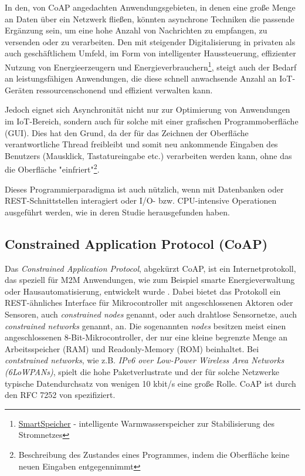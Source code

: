 In den, von CoAP angedachten Anwendungsgebieten, in denen eine große Menge an Daten über ein Netzwerk fließen, könnten asynchrone Techniken die passende Ergänzung sein, um eine hohe Anzahl von Nachrichten zu empfangen, zu versenden oder zu verarbeiten. Den mit steigender Digitalisierung in privaten als auch geschäftlichem Umfeld, im Form von intelligenter Haussteuerung, effizienter Nutzung von Energieerzeugern und Energieverbrauchern\footnote{\href{https://www.a1energysolutions.at/smartspeicher/}{SmartSpeicher} - intelligente Warmwasserspeicher zur Stabilisierung des Stromnetzes}, steigt auch der Bedarf an leistungsfähigen Anwendungen, die diese schnell anwachsende Anzahl an IoT-Geräten ressourcenschonend und effizient verwalten kann. 

Jedoch eignet sich Asynchronität nicht nur zur Optimierung von Anwendungen im IoT-Bereich, sondern auch für solche mit einer grafischen Programmoberfläche (GUI). Dies hat den Grund, da der für das Zeichnen der Oberfläche verantwortliche Thread freibleibt und somit neu ankommende Eingaben des Benutzers (Mausklick, Tastatureingabe etc.) verarbeiten werden kann, ohne das die Oberfläche "einfriert"\footnote{Beschreibung des Zustandes eines Programmes, indem die Oberfläche keine neuen Eingaben entgegennimmt}.

Dieses Programmierparadigma ist auch nützlich, wenn mit Datenbanken oder REST-Schnittstellen interagiert oder I/O- bzw. CPU-intensive Operationen ausgeführt werden, wie \citeauthor{okur2014study} in deren Studie  \autocite{okur2014study} herausgefunden haben.

\subsection{Constrained Application Protocol (CoAP)}
\label{subsec:constrained-application-protocol}

Das \textit{Constrained Application Protocol}, abgekürzt CoAP, ist ein Internetprotokoll, das speziell für M2M Anwendungen, wie zum Beispiel smarte Energieverwaltung oder Hausautomatisierung, entwickelt wurde \autocite{coap}. Dabei bietet das Protokoll ein REST-ähnliches Interface für Mikrocontroller mit angeschlossenen Aktoren oder Sensoren, auch \textit{constrained nodes} genannt, oder auch drahtlose Sensornetze, auch \textit{constrained networks} genannt, an. Die sogenannten \textit{nodes} besitzen meist einen angeschlossenen 8-Bit-Mikrocontroller, der nur eine kleine begrenzte Menge an Arbeitsspeicher (RAM) und Readonly-Memory (ROM) beinhaltet. Bei \textit{contstrained networks}, wie z.B. \textit{IPv6 over Low-Power Wireless Area Networks (6LoWPANs)}, spielt die hohe Paketverlustrate und der für solche Netzwerke typische Datendurchsatz von wenigen 10 kbit/s eine große Rolle. CoAP ist durch den RFC 7252 von \citeauthor{RFC7252} \cite{RFC7252} spezifiziert.


